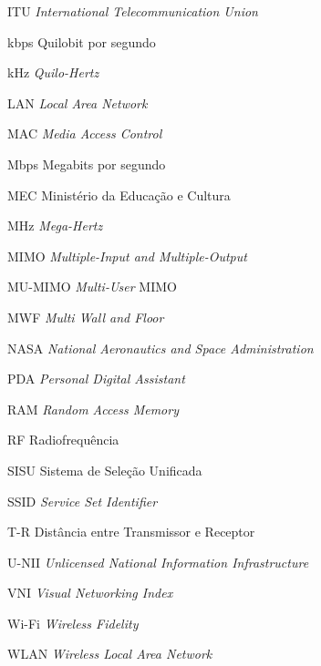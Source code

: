 \begin{siglas}
	\item[ITU] \hspace{.8cm} \textit{International Telecommunication Union}
	\item[kbps] \hspace{.8cm} Quilobit por segundo
	\item[kHz] \hspace{.8cm} \textit{Quilo-Hertz}
	\item[LAN] \hspace{.8cm} \textit{Local Area Network}
	\item[MAC] \hspace{.8cm} \textit{Media Access Control}
	\item[Mbps] \hspace{.8cm} Megabits por segundo
	\item[MEC] \hspace{.8cm} Ministério da Educação e Cultura
	\item[MHz] \hspace{.8cm} \textit{Mega-Hertz}
	\item[MIMO] \hspace{.8cm} \textit{Multiple-Input and Multiple-Output}
	\item[MU-MIMO] \hspace{.8cm} \textit{Multi-User} MIMO
	\item[MWF] \hspace{.8cm} \textit{Multi Wall and Floor}
	\item[NASA] \hspace{.8cm} \textit{National Aeronautics and Space Administration}
	\item[PDA] \hspace{.8cm} \textit{Personal Digital Assistant}
	\item[RAM] \hspace{.8cm} \textit{Random Access Memory}
	\item[RF] \hspace{.8cm} Radiofrequência
	\item[SISU] \hspace{.8cm} Sistema de Seleção Unificada
	\item[SSID] \hspace{.8cm} \textit{Service Set Identifier}
	\item[T-R] \hspace{.8cm} Distância entre Transmissor e Receptor
	\item[U-NII] \hspace{.8cm} \textit{Unlicensed National Information Infrastructure}
	\item[VNI] \hspace{.8cm} \textit{Visual Networking Index}
	\item[Wi-Fi] \hspace{.8cm} \textit{Wireless Fidelity}
	\item[WLAN] \hspace{.8cm} \textit{Wireless Local Area Network}
\end{siglas}